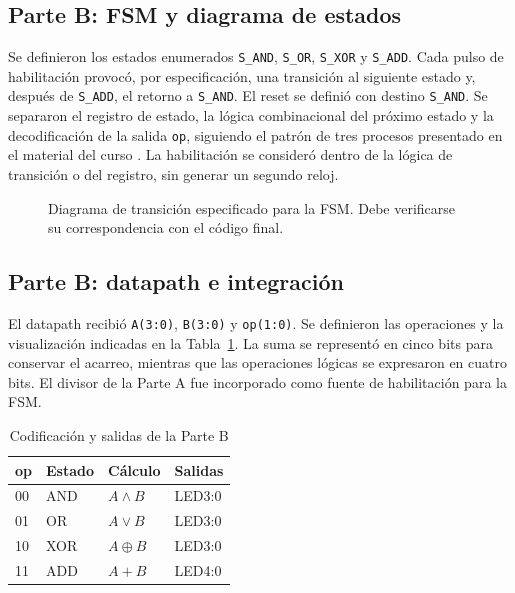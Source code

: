 \documentclass[conference]{IEEEtran}
\begin{document}
\subsection{Parte B: FSM y diagrama de estados}
Se definieron los estados enumerados \texttt{S\_AND}, \texttt{S\_OR}, \texttt{S\_XOR} y \texttt{S\_ADD}. Cada pulso de habilitación provocó, por especificación, una transición al siguiente estado y, después de \texttt{S\_ADD}, el retorno a \texttt{S\_AND}. El reset se definió con destino \texttt{S\_AND}. Se separaron el registro de estado, la lógica combinacional del próximo estado y la decodificación de la salida \texttt{op}, siguiendo el patrón de tres procesos presentado en el material del curso \cite{cursofsm}. La habilitación se consideró dentro de la lógica de transición o del registro, sin generar un segundo reloj.

\begin{figure}[!t]
\centering
{}
\caption{Diagrama de transición especificado para la FSM. Debe verificarse su correspondencia con el código final.}\label{fig:fsm}
\end{figure}

\subsection{Parte B: datapath e integración}
El datapath recibió \texttt{A(3:0)}, \texttt{B(3:0)} y \texttt{op(1:0)}. Se definieron las operaciones y la visualización indicadas en la Tabla~\ref{tab:ops}. La suma se representó en cinco bits para conservar el acarreo, mientras que las operaciones lógicas se expresaron en cuatro bits. El divisor de la Parte A fue incorporado como fuente de habilitación para la FSM.

\begin{table}[!t]
\centering\caption{Codificación y salidas de la Parte B}\label{tab:ops}
\begin{tabular}{@{}lllp{}@{}}\toprule
\textbf{op} & \textbf{Estado} & \textbf{Cálculo} & \textbf{Salidas}\\\midrule
00 & AND & \(A\land B\) & LED3:0\\
01 & OR & \(A\lor B\) & LED3:0\\
10 & XOR & \(A\oplus B\) & LED3:0\\
11 & ADD & \(A+B\) & LED4:0\\\bottomrule
\end{tabular}
\end{table}
\end{document}
